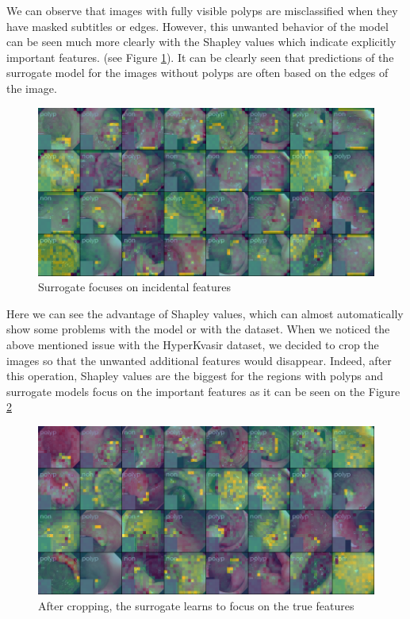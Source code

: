 \documentclass[magisterska,en]{pracamgr}
\begin{document}
We can observe that images with fully visible polyps are misclassified when they have masked subtitles or edges. 
However, this unwanted behavior of the model can be seen much more clearly with the Shapley values which indicate explicitly important features. 
(see Figure \ref{Shapley values gastro}). It can be clearly seen that predictions of the surrogate model for the images without polyps are often based on the edges of the image. 

\begin{figure}[H]
\centering
\includegraphics[scale=0.5]{./images/shap_gastro_edges.png}
\caption{Surrogate focuses on incidental features}
\label{Shapley values gastro}
\end{figure}




Here we can see the advantage of Shapley values, which can almost automatically show some problems with the model or with the dataset.
When we noticed the above mentioned issue with the HyperKvasir dataset, we decided to crop the images so that the unwanted additional features would disappear. Indeed, after this operation, Shapley values are the biggest for the regions with polyps and surrogate models focus on the important features as it can be seen on the Figure 
\ref{Shapley values for 196 players cropped gastro}

\begin{figure}[H]
\centering
\includegraphics[scale=0.5]{./images/cropped_shap_gastro.png}
\caption{After cropping, the surrogate learns to focus on the true features}
\label{Shapley values for 196 players cropped gastro}
\end{figure}
\end{document}

